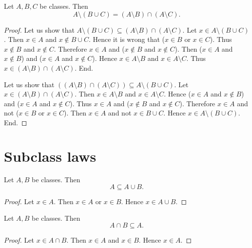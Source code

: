 \documentclass[../set-theory.tex]{subfiles}
\begin{document}
  \begin{forthel}
    \begin{proposition}\label{SET_THEORY_02_2909554153095168}
      Let $A, B, C$ be classes.
      Then \[ A \setminus (B \cup C) = (A \setminus B) \cap (A \setminus C). \]
    \end{proposition}
    \begin{proof}
      Let us show that $A \setminus (B \cup C) \subseteq (A \setminus B) \cap (A \setminus C)$.
        Let $x \in A \setminus (B \cup C)$.
        Then $x \in A$ and $x \notin B \cup C$.
        Hence it is wrong that ($x \in B$ or $x \in C$).
        Thus $x \notin B$ and $x \notin C$.
        Therefore $x \in A$ and ($x \notin B$ and $x \notin C$).
        Then ($x \in A$ and $x \notin B$) and ($x \in A$ and $x \notin C$).
        Hence $x \in A \setminus B$ and $x \in A \setminus C$.
        Thus $x \in (A \setminus B) \cap (A \setminus C)$.
      End.

      Let us show that $((A \setminus B) \cap (A \setminus C)) \subseteq A \setminus (B \cup C)$. %
        Let $x \in (A \setminus B) \cap (A \setminus C)$.
        Then $x \in A \setminus B$ and $x \in A \setminus C$.
        Hence ($x \in A$ and $x \notin B$) and ($x \in A$ and $x \notin C$).
        Thus $x \in A$ and ($x \notin B$ and $x \notin C$).
        Therefore $x \in A$ and not ($x \in B$ or $x \in C$).
        Then $x \in A$ and not $x \in B \cup C$.
        Hence $x \in A \setminus (B \cup C)$.
      End.
    \end{proof}
  \end{forthel}


  \section*{Subclass laws}

  \begin{forthel}
    \begin{proposition}\label{SET_THEORY_02_3793981508943872}
      Let $A, B$ be classes.
      Then \[ A \subseteq A \cup B. \]
    \end{proposition}
    \begin{proof}
      Let $x \in A$.
      Then $x \in A$ or $x \in B$.
      Hence $x \in A \cup B$.
    \end{proof}
  \end{forthel}

  \begin{forthel}
    \begin{proposition}\label{SET_THEORY_02_1591517646946304}
      Let $A, B$ be classes.
      Then \[ A \cap B \subseteq A. \]
    \end{proposition}
    \begin{proof}
      Let $x \in A \cap B$.
      Then $x \in A$ and $x \in B$.
      Hence $x \in A$.
    \end{proof}
  \end{forthel}
\end{document}
